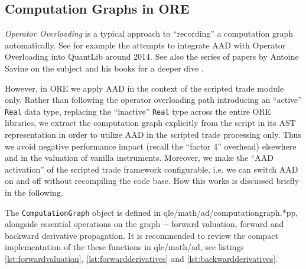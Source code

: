 \subsection{Computation Graphs in ORE}

{\em Operator Overloading} is a typical approach to ``recording'' a computation graph automatically.
See for example the attempts to integrate AAD with Operator Overloading into QuantLib \cite{QuantLib}
around 2014. See also the series of papers by Antoine Savine on the subject \cite{savine_cg_1,
  savine_cg_2, savine_cg_3} and his books for a deeper dive \cite{savine_book_1, savine_book_2}.

However, in ORE we apply AAD in the context of the scripted trade module only. Rather than following
the operator overloading path introducing an ``active'' {\tt Real} data type, replacing the
``inactive'' {\tt Real} type across the entire ORE libraries, we extract the computation graph
explicitly from the script in its AST representation in order to utilize AAD in the scripted trade
processing only. Thus we avoid negative performance impact (recall the ``factor 4'' overhead)
elsewhere and in the valuation of vanilla instruments. Moreover, we make the ``AAD activation'' of the
scripted trade framework configurable, i.e. we can switch AAD on and off without recompiling the
code base. How this works is discussed briefly in the following.

The {\tt ComputationGraph} object is defined in qle/math/ad/computationgraph.*pp, alongside
essential operations on the graph -{}- forward valuation, forward and backward derivative propagation.
It is recommended to review the compact implementation of the these functions in qle/math/ad,
see listings \ref{lst:forwardvaluation}, \ref{lst:forwardderivatives} and \ref{lst:backwardderivatives}.

